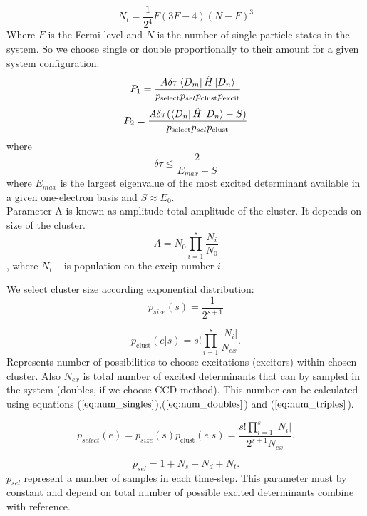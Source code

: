 \documentclass[twoside,english]{uiofysmaster}
\theoremstyle{definition}
\begin{document}
\begin{equation}\label{eq:num_triples}
N_t = \frac{1}{2^4}F(3F-4)(N-F)^3
\end{equation}
Where $F$ is the Fermi level and $N$ is the number of single-particle states in the system. So we choose single or double proportionally to their amount for a given system configuration.
\begin{equation}
P_1 = \frac{A \delta \tau \bra{D_m}\hat{H} \ket{D_n}}{p_{\text{select}}p_{sel}p_{\text{clust}}p_{\text{excit}}}
\end{equation}
\begin{equation}
P_2 = \frac{A \delta \tau (\bra{D_n}\hat{H} \ket{D_n}-S)}{p_{\text{select}}p_{sel}p_{\text{clust}}}
\end{equation}
where
\begin{equation}
\delta \tau \leq \frac{2}{E_{max} - S}
\end{equation}
where $E_{max}$ is the largest eigenvalue of the most excited determinant available in a given one-electron basis and $S \approx E_0$.\\
Parameter A is known as amplitude total amplitude of the cluster. It depends on size of the cluster.
\begin{equation}
A = N_0  \prod_{i=1}^s \frac{N_i}{N_0}
\end{equation},
where $N_i$ -- is population on the excip number $i$.

We select cluster size according exponential distribution:
\begin{equation}
p_{size}(s)=\frac{1}{2^{s+1}}
\end{equation}

\begin{equation}
p_{\text{clust}} (e|s)= s! \prod_{i=1}^s \frac{|N_i|}{N_{ex}}.
\end{equation}
Represents number of possibilities to choose excitations (excitors) within chosen cluster. Also $N_{ex}$ is total number of excited determinants that can by sampled in the system (doubles, if we choose CCD method). This number can be calculated using equations ($\ref{eq:num_singles}$),($\ref{eq:num_doubles}$) and ($\ref{eq:num_triples}$).

\begin{equation}
p_{select}(e)= p_{size}(s) p_{\text{clust}} (e|s) =  \frac{s!\prod_{i=1}^{s} |N_i|}{2^{s+1}N_{ex}}.
\end{equation}



\begin{equation}
p_{sel}= 1+N_{s}+N_{d}+N_{t}.
\end{equation}
$p_{sel}$ represent a number of samples in each time-step. This parameter must by constant and depend on total number of possible excited determinants combine with reference.
\end{document}
